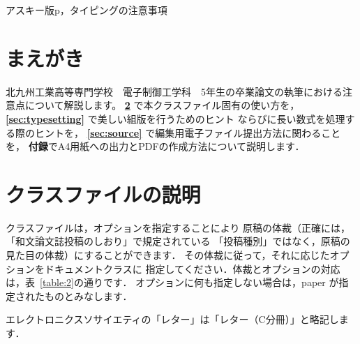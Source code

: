 \documentclass[paper]{thesis}%
\begin{document}
\makeatletter
\if@letter
\makeatother
\maketitle
\fi
\begin{abstract}
電子制御工学科卒業論文用p\LaTeXe クラスファイルの使い方・および卒業論文の書き方を説明します．
本クラスファイルに基づく記述の仕方，クラスファイル使用上の注意点，
ならびにタイピングの際の注意事項です．
本クラスファイルは，アスキー版 p\LaTeXe\ に基づいて作成しています．
\end{abstract}
\begin{keyword}
アスキー版p\LaTeXe{}，タイピングの注意事項
\end{keyword}
\makeatletter
\if@letter
\makeatother
\else
 \maketitle
\fi

\section{まえがき}

北九州工業高等専門学校　電子制御工学科　5年生の卒業論文の執筆における注意点について解説します。
{\bfseries \ref{sec:cls}} で本クラスファイル固有の使い方を，
{\bfseries \ref{sec:typesetting}} で美しい組版を行うためのヒント
ならびに長い数式を処理する際のヒントを，
{\bfseries \ref{sec:source}} で編集用電子ファイル提出方法に関わることを，
{\bfseries 付録}でA4用紙への出力とPDFの作成方法について説明します．


\section{クラスファイルの説明}
\label{sec:cls}

クラスファイルは，オプションを指定することにより
原稿の体裁（正確には，「和文論文誌投稿のしおり」で規定されている
「投稿種別」ではなく，原稿の見た目の体裁）にすることができます．
その体裁に従って，それに応じたオプションをドキュメントクラスに
指定してください．体裁とオプションの対応は，表~\ref{table:2}の通りです．
オプションに何も指定しない場合は，paper が指定されたものとみなします．

エレクトロニクスソサイエティの「レター」は「レター（C分冊）」と略記します．
\end{document}
